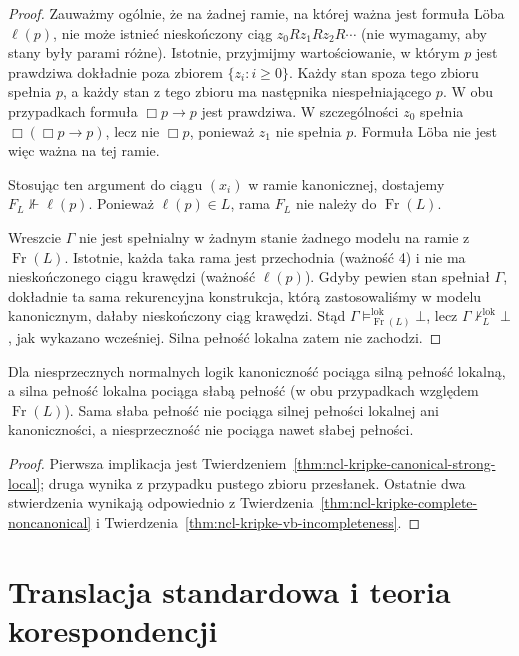 \begin{proof}
Zauważmy ogólnie, że na żadnej ramie,
na której ważna jest formuła Löba $\ell(p)$,
nie może istnieć nieskończony ciąg
$z_0Rz_1Rz_2R\cdots$ (nie wymagamy, aby
stany były parami różne). Istotnie,
przyjmijmy wartościowanie, w którym
$p$ jest prawdziwa dokładnie poza zbiorem
$\{z_i:i\geq0\}$.
Każdy stan spoza tego zbioru spełnia $p$,
a każdy stan z tego zbioru ma następnika
niespełniającego $p$. W obu przypadkach
formuła $\Box p\to p$ jest prawdziwa.
W szczególności $z_0$ spełnia
$\Box(\Box p\to p)$, lecz nie $\Box p$,
ponieważ $z_1$ nie spełnia $p$.
Formuła Löba nie jest więc ważna na tej ramie.

Stosując ten argument do ciągu $(x_i)$
w ramie kanonicznej, dostajemy
$F_L\not\Vdash\ell(p)$.
Ponieważ $\ell(p)\in L$, rama $F_L$
nie należy do $\operatorname{Fr}(L)$.

Wreszcie $\Gamma$ nie jest spełnialny
w żadnym stanie żadnego modelu na ramie
z $\operatorname{Fr}(L)$.
Istotnie, każda taka rama jest przechodnia
(ważność 4) i nie ma nieskończonego ciągu
krawędzi (ważność $\ell(p)$).
Gdyby pewien stan spełniał $\Gamma$,
dokładnie ta sama rekurencyjna konstrukcja,
którą zastosowaliśmy w modelu kanonicznym,
dałaby nieskończony ciąg krawędzi.
Stąd $\Gamma\models_{\operatorname{Fr}(L)}^{\mathrm{lok}}\bot$,
lecz $\Gamma\not\vdash_L^{\mathrm{lok}}\bot$,
jak wykazano wcześniej. Silna pełność
lokalna zatem nie zachodzi.
\end{proof}

\begin{wniosek}
\label{cor:ncl-kripke-completeness-hierarchy}
Dla niesprzecznych normalnych logik
kanoniczność pociąga silną pełność lokalną,
a silna pełność lokalna pociąga słabą
pełność (w obu przypadkach względem
$\operatorname{Fr}(L)$).
Sama słaba pełność nie pociąga silnej
pełności lokalnej ani kanoniczności,
a niesprzeczność nie pociąga nawet słabej pełności.
\end{wniosek}
\begin{proof}
Pierwsza implikacja jest
Twierdzeniem~\ref{thm:ncl-kripke-canonical-strong-local};
druga wynika z przypadku pustego zbioru
przesłanek. Ostatnie dwa stwierdzenia wynikają
odpowiednio z
Twierdzenia~\ref{thm:ncl-kripke-complete-noncanonical}
i Twierdzenia~\ref{thm:ncl-kripke-vb-incompleteness}.
\end{proof}

\section{Translacja standardowa i teoria korespondencji}


